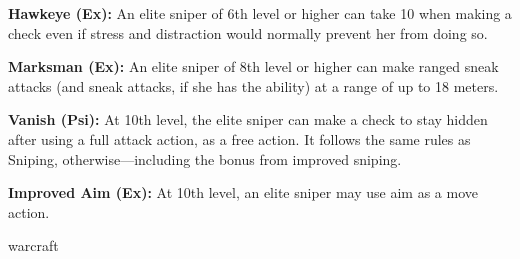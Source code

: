{\textbf{Hawkeye (Ex):} An elite sniper of 6th level or higher can take 10 when making a  check even if stress and distraction would normally prevent her from doing so.

\textbf{Marksman (Ex):} An elite sniper of 8th level or higher can make ranged sneak attacks (and sneak attacks, if she has the ability) at a range of up to 18 meters.

\textbf{Vanish (Psi):} At 10th level, the elite sniper can make a  check to stay hidden after using a full attack action, as a free action. It follows the same rules as Sniping, otherwise---including the bonus from improved sniping.

\textbf{Improved Aim (Ex):} At 10th level, an elite sniper may use aim as a move action.
}
{}
{warcraft}
{}
{}
{}